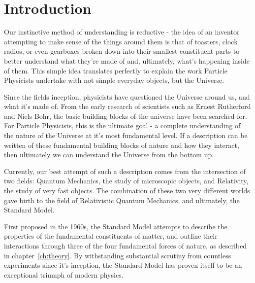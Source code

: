 
\chapter{Introduction}  %

\ifpdf
    \graphicspath{{Chapter1/Figs/Raster/}{Chapter1/Figs/PDF/}{Chapter1/Figs/}}
\else
    \graphicspath{{Chapter1/Figs/Vector/}{Chapter1/Figs/}}
\fi


\label{sec:introduction_intro}

Our instinctive method of understanding is reductive - the idea of an
inventor attempting to make sense of the things around them is
that of toasters, clock radios, or even gearboxes broken down into
their smallest constituent parts to better understand what they're made of and,
ultimately, what's happening inside of them. This simple idea translates
perfectly to explain the work Particle Physicists undertake with
not simple everyday objects, but the Universe.

Since the fields inception, physicists have questioned the Universe
around us, and what it's made of. From the early research of scientists such as
Ernest Rutherford and Niels Bohr, the basic building
blocks of the universe have been searched for. For Particle Physicists, this is
the ultimate goal - a complete understanding of the nature of the Universe
at it's most
fundamental level. If a description can be written of these fundamental
building blocks of
nature and how they interact, then ultimately we can understand
the Universe from the bottom up.

Currently, our best attempt of such a description comes from the intersection of
two
fields: Quantum Mechanics, the study of microscopic objects, and Relativity, the
study of very fast objects. The combination of these
two very different worlds gave birth to the field of Relativistic
Quantum Mechanics, and ultimately, the Standard Model.

First proposed in the 1960s, the Standard Model attempts to describe the
properties of the fundamental constituents of matter, and outline their
interactions through three of the four fundamental forces of nature, as
described in chapter~\ref{ch:theory}.
By withstanding substantial scrutiny from countless experiments since it's
inception, the Standard Model has proven itself to be an exceptional
triumph of modern physics.

